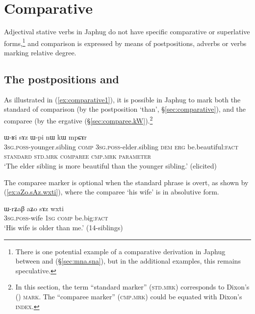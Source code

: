 \section{Comparative} \label{sec:comparison}
Adjectival stative verbs in Japhug do not have specific comparative or superlative forms,\footnote{There is  one potential example of a comparative derivation in Japhug between  and  (§\ref{sec:mna.sna}), but in the additional examples, this remains speculative. } and comparison is expressed by means of postpositions, adverbs or verbs marking relative degree.


\subsection{The postpositions  and } \label{sec:sAz.kW}
As illustrated in (\ref{ex:comparative1}), it is possible in Japhug to mark both the  standard of comparison (by the postposition  `than', §\ref{sec:comparative}), and the comparee (by  the ergative  (§\ref{sec:comparee.kW}).\footnote{In this section, the term ``standard marker'' (\textsc{std}.\textsc{mrk}) corresponds to Dixon's (\citeyear{dixon08comparative}) \textsc{mark}. The ``comparee marker'' (\textsc{cmp}.\textsc{mrk}) could be equated with Dixon's \textsc{index}. } 



\begin{exe}
\ex \label{ex:comparative1}
\glll  ɯ-ʁi sɤz ɯ-pi nɯ {                  } kɯ   mpɕɤr  \\
\textsc{3sg}.\textsc{poss}-younger.sibling \textsc{comp} \textsc{3sg}.\textsc{poss}-elder.sibling \textsc{dem} {   } \textsc{erg} be.beautiful:\textsc{fact} \\
\textsc{standard} \textsc{std}.\textsc{mrk} \textsc{comparee} { } {         } \textsc{cmp}.\textsc{mrk} \textsc{parameter} \\
\glt `The elder sibling is more beautiful than the younger sibling.'  (elicited)
\end{exe}


The comparee marker is optional when the standard phrase is overt, as shown by (\ref{ex:aZo.sAz.wxti}), where the comparee  `his wife' is in absolutive form.

\begin{exe}
\ex \label{ex:aZo.sAz.wxti}
\gll ɯ-rʑaβ aʑo sɤz wxti \\
\textsc{3sg}.\textsc{poss}-wife \textsc{1sg} \textsc{comp} be.big:\textsc{fact} \\
\glt `His wife is older than me.' (14-siblings)
\end{exe}

